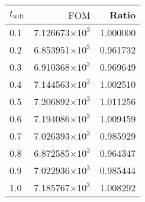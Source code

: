 \begin{tabular}{lrr}
\toprule
$t_{\mathrm{wdt}}$ & $\overline{\mathrm{FOM}}$ &    Ratio \\
\midrule
               0.1 &   7.126673$\times 10^{3}$ & 1.000000 \\
               0.2 &   6.853951$\times 10^{3}$ & 0.961732 \\
               0.3 &   6.910368$\times 10^{3}$ & 0.969649 \\
               0.4 &   7.144563$\times 10^{3}$ & 1.002510 \\
               0.5 &   7.206892$\times 10^{3}$ & 1.011256 \\
               0.6 &   7.194086$\times 10^{3}$ & 1.009459 \\
               0.7 &   7.026393$\times 10^{3}$ & 0.985929 \\
               0.8 &   6.872585$\times 10^{3}$ & 0.964347 \\
               0.9 &   7.022936$\times 10^{3}$ & 0.985444 \\
               1.0 &   7.185767$\times 10^{3}$ & 1.008292 \\
\bottomrule
\end{tabular}
